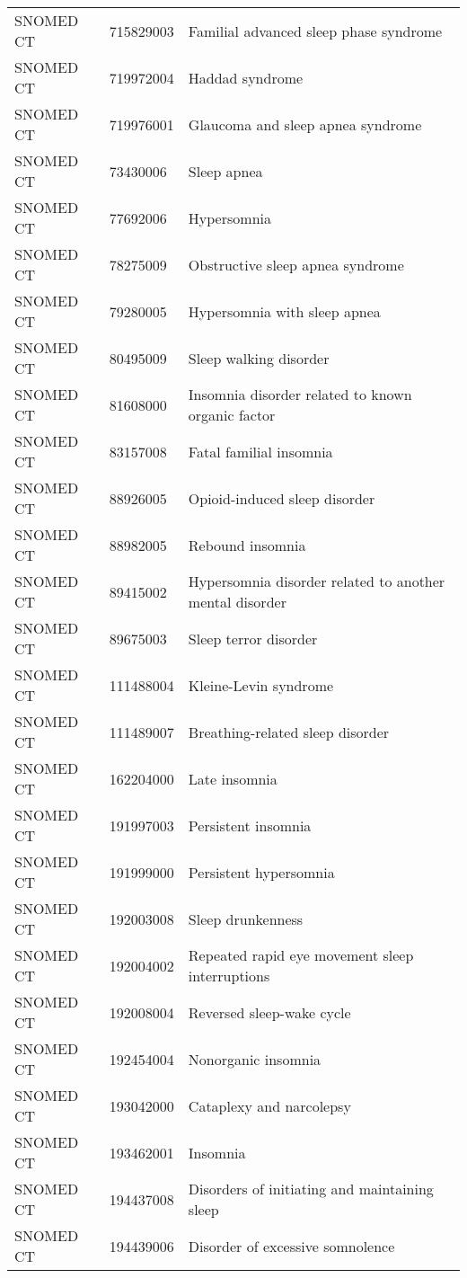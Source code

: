\begin{longtable}{p{}p{}p{}}
  SNOMED CT & 715829003 & Familial advanced sleep phase syndrome \\ 
  SNOMED CT & 719972004 & Haddad syndrome \\ 
  SNOMED CT & 719976001 & Glaucoma and sleep apnea syndrome \\ 
  SNOMED CT & 73430006 & Sleep apnea \\ 
  SNOMED CT & 77692006 & Hypersomnia \\ 
  SNOMED CT & 78275009 & Obstructive sleep apnea syndrome \\ 
  SNOMED CT & 79280005 & Hypersomnia with sleep apnea \\ 
  SNOMED CT & 80495009 & Sleep walking disorder \\ 
  SNOMED CT & 81608000 & Insomnia disorder related to known organic factor \\ 
  SNOMED CT & 83157008 & Fatal familial insomnia \\ 
  SNOMED CT & 88926005 & Opioid-induced sleep disorder \\ 
  SNOMED CT & 88982005 & Rebound insomnia \\ 
  SNOMED CT & 89415002 & Hypersomnia disorder related to another mental disorder \\ 
  SNOMED CT & 89675003 & Sleep terror disorder \\ 
  SNOMED CT & 111488004 & Kleine-Levin syndrome \\ 
  SNOMED CT & 111489007 & Breathing-related sleep disorder \\ 
  SNOMED CT & 162204000 & Late insomnia \\ 
  SNOMED CT & 191997003 & Persistent insomnia \\ 
  SNOMED CT & 191999000 & Persistent hypersomnia \\ 
  SNOMED CT & 192003008 & Sleep drunkenness \\ 
  SNOMED CT & 192004002 & Repeated rapid eye movement sleep interruptions \\ 
  SNOMED CT & 192008004 & Reversed sleep-wake cycle \\ 
  SNOMED CT & 192454004 & Nonorganic insomnia \\ 
  SNOMED CT & 193042000 & Cataplexy and narcolepsy \\ 
  SNOMED CT & 193462001 & Insomnia \\ 
  SNOMED CT & 194437008 & Disorders of initiating and maintaining sleep \\ 
  SNOMED CT & 194439006 & Disorder of excessive somnolence \\ 

\end{longtable}
